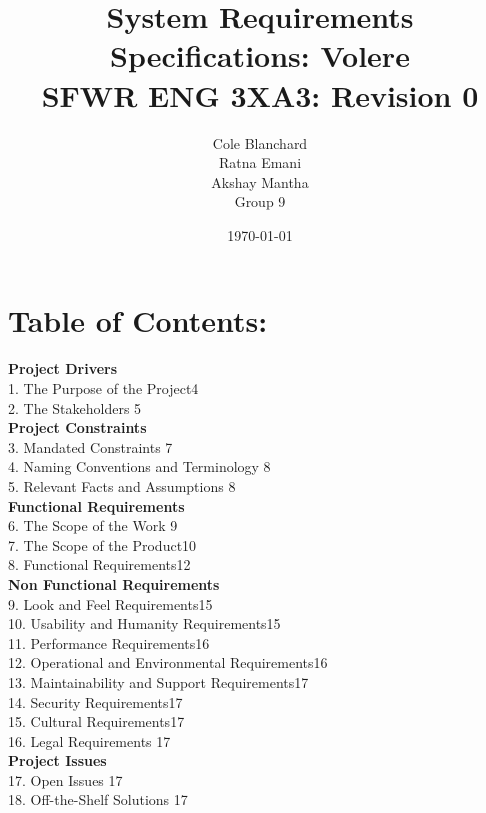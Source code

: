 \documentclass[12pt]{article}
\begin{document}
\title{System Requirements Specifications: Volere\\SFWR ENG 3XA3: Revision 0}
\author{Cole Blanchard\\Ratna Emani\\Akshay Mantha\\Group 9}
\date{\today}
\maketitle
\pagebreak

\section*{Table of Contents:}
\textbf{Project Drivers}\\
1. The Purpose of the Project\hfill \hfill 4\\
2. The Stakeholders \hfill \hfill 5\\
\textbf{Project Constraints}\\
3. Mandated Constraints \hfill \hfill 7\\
4. Naming Conventions and Terminology \hfill \hfill 8\\
5. Relevant Facts and Assumptions \hfill \hfill 8\\
\textbf{Functional Requirements}\\
6. The Scope of the Work \hfill \hfill 9\\
7. The Scope of the Product\hfill \hfill 10\\
8. Functional Requirements\hfill \hfill 12\\
\textbf{Non Functional Requirements}\\
9. Look and Feel Requirements\hfill \hfill 15\\
10. Usability and Humanity Requirements\hfill \hfill 15\\
11. Performance Requirements\hfill \hfill 16\\
12. Operational and Environmental Requirements\hfill \hfill 16\\
13. Maintainability and Support Requirements\hfill \hfill 17\\
14. Security Requirements\hfill \hfill 17\\
15. Cultural Requirements\hfill \hfill 17\\
16. Legal Requirements \hfill \hfill 17\\
\textbf{Project Issues}\\
17. Open Issues \hfill \hfill 17\\
18. Off-the-Shelf Solutions \hfill \hfill 17\\
\end{document}
